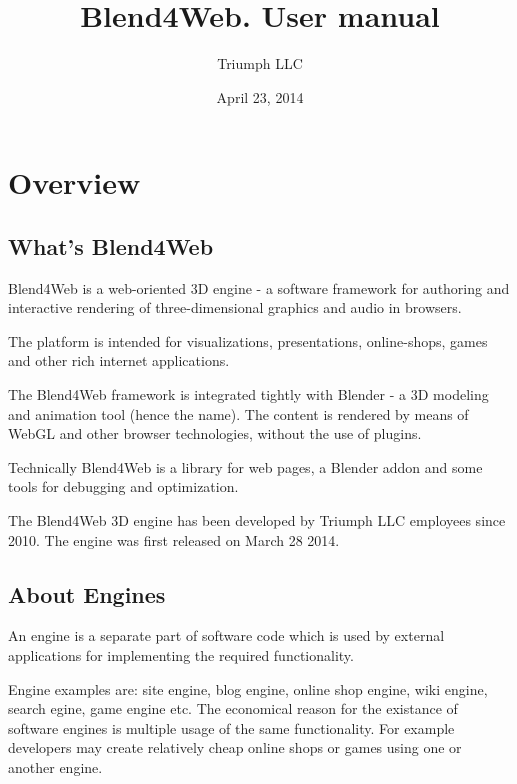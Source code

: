 \documentclass[a4paper,12pt,oneside]{sphinxmanual}
\title{Blend4Web. User manual}
\date{April 23, 2014}
\author{Triumph LLC}
\begin{document}
\maketitle
\tableofcontents
{}\label{index::doc}



\chapter{Overview}
\label{about:about}\label{about::doc}\label{about:id1}

\section{What's Blend4Web}
\label{about:about-product}\label{about:blend4web}\label{about:index-0}
Blend4Web is a web-oriented 3D engine - a software framework for authoring and interactive rendering of three-dimensional graphics and audio in browsers.

The platform is intended for visualizations, presentations, online-shops, games and other rich internet applications.

The Blend4Web framework is integrated tightly with Blender - a 3D modeling and animation tool (hence the name). The content is rendered by means of WebGL and other browser technologies, without the use of plugins.

Technically Blend4Web is a library for web pages, a Blender addon and some tools for debugging and optimization.

The Blend4Web 3D engine has been developed by Triumph LLC employees since 2010. The engine was first released on March 28 2014.


\section{About Engines}
\label{about:about-engine}\label{about:id2}\label{about:index-1}
An engine is a separate part of software code which is used by external applications for implementing the required functionality.

Engine examples are: site engine, blog engine, online shop engine, wiki engine, search egine, game engine etc. The economical reason for the existance of software engines is multiple usage of the same functionality. For example developers may create relatively cheap online shops or games using one or another engine.
\end{document}
